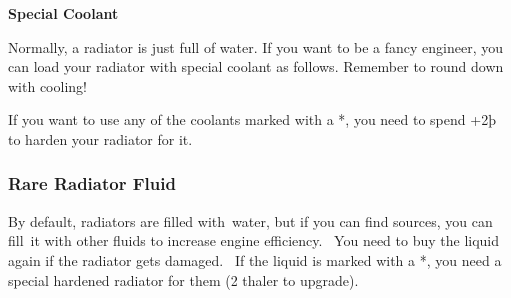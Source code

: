 \documentclass{article}
\begin{document}
\textbf{Special Coolant}

Normally, a radiator is just full of water. If you want to be a fancy
engineer, you can load your radiator with special coolant as follows.
Remember to round down with cooling!

If you want to use any of the coolants marked with a *, you need to
spend +2þ to harden your radiator for it.

\subsubsection{Rare Radiator Fluid}
\label{_Rare_Radiator_Fluid}

By default, radiators are filled with~water, but if you can find
sources, you can fill~it with other fluids to increase engine
efficiency.~ You need to buy the liquid again if the radiator gets
damaged.~ If the liquid is marked with a *, you need a special hardened
radiator for them (2 thaler to upgrade).
\end{document}
